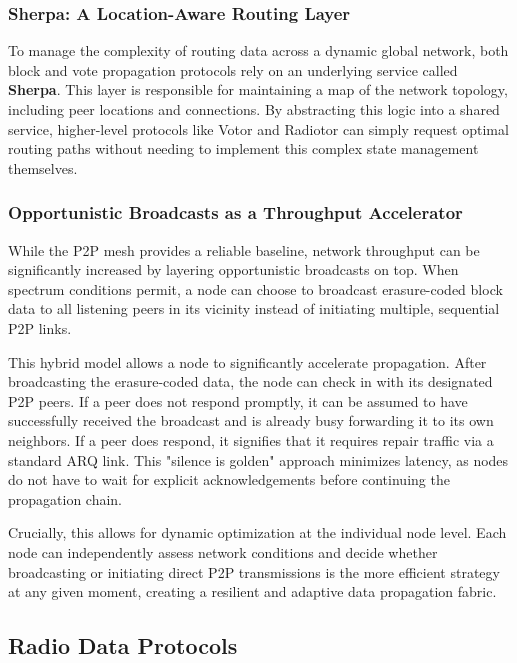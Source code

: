 \documentclass{article}
\begin{document}
\subsubsection{Sherpa: A Location-Aware Routing Layer}

To manage the complexity of routing data across a dynamic global network, both block and vote propagation protocols rely on an underlying service called \textbf{Sherpa}. This layer is responsible for maintaining a map of the network topology, including peer locations and connections. By abstracting this logic into a shared service, higher-level protocols like Votor and Radiotor can simply request optimal routing paths without needing to implement this complex state management themselves.

\subsubsection{Opportunistic Broadcasts as a Throughput Accelerator}
\label{sec:opportunistic_broadcasts}

While the P2P mesh provides a reliable baseline, network throughput can be significantly increased by layering opportunistic broadcasts on top. When spectrum conditions permit, a node can choose to broadcast erasure-coded block data to all listening peers in its vicinity instead of initiating multiple, sequential P2P links.

This hybrid model allows a node to significantly accelerate propagation. After broadcasting the erasure-coded data, the node can check in with its designated P2P peers. If a peer does not respond promptly, it can be assumed to have successfully received the broadcast and is already busy forwarding it to its own neighbors. If a peer does respond, it signifies that it requires repair traffic via a standard ARQ link. This "silence is golden" approach minimizes latency, as nodes do not have to wait for explicit acknowledgements before continuing the propagation chain.

Crucially, this allows for dynamic optimization at the individual node level. Each node can independently assess network conditions and decide whether broadcasting or initiating direct P2P transmissions is the more efficient strategy at any given moment, creating a resilient and adaptive data propagation fabric.

\subsection{Radio Data Protocols}
\end{document}
